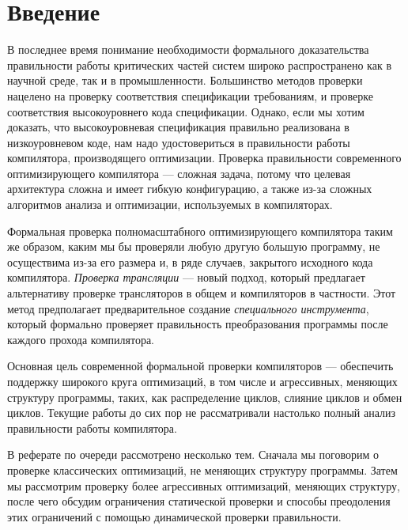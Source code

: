 \section*{Введение}
%

В последнее время понимание необходимости формального доказательства правильности работы критических частей систем широко распространено как в научной среде, так и в промышленности. Большинство методов проверки нацелено на проверку соответствия спецификации требованиям, и проверке соответствия высокоуровнего кода спецификации. Однако, если мы хотим доказать, что высокоуровневая спецификация правильно реализована в низкоуровневом коде, нам надо удостовериться в правильности работы компилятора, производящего оптимизации. Проверка правильности современного оптимизирующего компилятора --- сложная задача, потому что целевая архитектура сложна и имеет гибкую конфигурацию, а также из-за сложных алгоритмов анализа и оптимизации, используемых в компиляторах.

Формальная проверка полномасштабного оптимизирующего компилятора таким же образом, каким мы бы проверяли любую другую большую программу, не осуществима из-за его размера и, в ряде случаев, закрытого исходного кода компилятора. \emph{Проверка трансляции} --- новый подход, который предлагает альтернативу проверке трансляторов в общем и компиляторов в частности. Этот метод предполагает предварительное создание \emph{специального инструмента}, который формально проверяет правильность преобразования программы после каждого прохода компилятора.

Основная цель современной формальной проверки компиляторов --- обеспечить поддержку широкого круга оптимизаций, в том числе и агрессивных, меняющих структуру программы, таких, как распределение циклов, слияние циклов и обмен циклов. Текущие работы \cite{PSS98a,Nec00,RM00,ZPFG02} до сих пор не рассматривали настолько полный анализ правильности работы компилятора.

В реферате по очереди рассмотрено несколько тем. Сначала мы поговорим о проверке классических оптимизаций, не меняющих структуру программы. Затем мы рассмотрим проверку более агрессивных оптимизаций, меняющих структуру, после чего обсудим ограничения статической проверки и способы преодоления этих ограничений с помощью динамической проверки правильности.